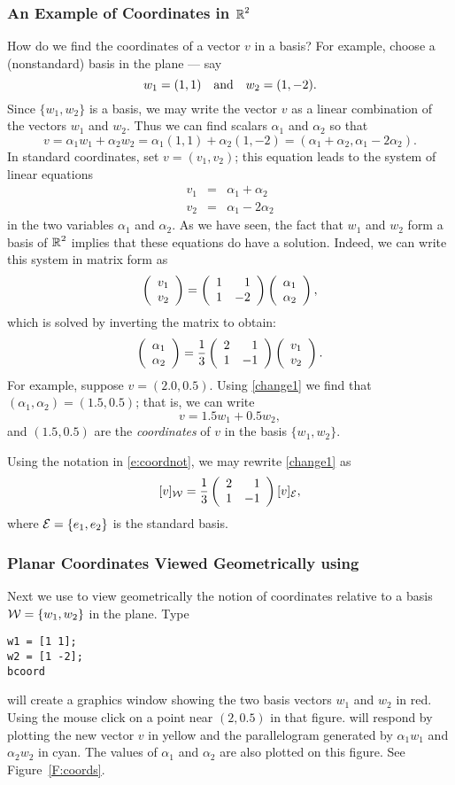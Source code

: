 \documentclass{ximera}
\begin{document}
\subsubsection*{An Example of Coordinates in $\mbox{$\Bbb{R}$}^2$}

How do we find the coordinates of a vector $v$ in a basis?  For example,
choose a (nonstandard) basis in the plane --- say
\[
w_1=(1,1) \quad\mbox{and}\quad w_2=(1,-2).
\]
Since $\{w_1,w_2\}$ is a basis, we may write the vector
$v$ as a linear combination of the vectors $w_1$ and
$w_2$.  Thus we can find scalars $\alpha_1$ and $\alpha_2$ so
that
\[
v=\alpha_1 w_1 + \alpha_2 w_2 = \alpha_1(1,1)+\alpha_2(1,-2)
= (\alpha_1+ \alpha_2,\alpha_1 -2 \alpha_2).
\]
In standard coordinates, set $v=(v_1,v_2)$; this equation leads to the
system of linear equations
\begin{eqnarray*}
v_1 & = & \alpha_1 + \alpha_2 \\
v_2 & = & \alpha_1 -2 \alpha_2
\end{eqnarray*}
in the two variables $\alpha_1$ and $\alpha_2$. As we have seen,
the fact that $w_1$ and $w_2$ form a basis of $\mbox{$\Bbb{R}$}^2$ implies that
these equations do have a solution.  Indeed, we can write this
system in matrix form as
\[
\left(\begin{array}{r} v_1 \\ v_2\end{array}\right) = \left(\begin{array}{rr} 1 & 1\\ 1 &-2\end{array}\right)\left(\begin{array}{r} \alpha_1 \\ \alpha_2\end{array}\right),
\]
which is solved by inverting the matrix to obtain:
\begin{equation} \label{change1}
\left(\begin{array}{r} \alpha_1 \\ \alpha_2\end{array}\right)= \frac{1}{3}\left(\begin{array}{rr} 2 & 1\\ 1 &-1\end{array}\right)
\left(\begin{array}{r} v_1 \\ v_2\end{array}\right).
\end{equation}
For example, suppose $v=(2.0,0.5)$.  Using \eqref{change1} we find that
$(\alpha_1,\alpha_2)=(1.5,0.5)$; that is, we can write
\[
v = 1.5w_1 + 0.5w_2,
\]
and $(1.5,0.5)$ are the {\em coordinates\/}  of
$v$ in the basis $\{w_1,w_2\}$.

Using the notation in \eqref{e:coordnot}, we may rewrite \eqref{change1} as
\[
[v]_{\cal W} = \frac{1}{3}\left(\begin{array}{rr} 2 & 1\\ 1 &-1\end{array}\right) [v]_{\cal E},
\]
where ${\cal E} = \{e_1,e_2\}$ is the standard basis.

\subsubsection*{Planar Coordinates Viewed Geometrically using \Matlab}

Next we use \Matlab to view geometrically the notion of coordinates
relative to a basis ${\cal W}=\{w_1,w_2\}$ in the plane.  Type
\begin{verbatim}
w1 = [1 1];
w2 = [1 -2];
bcoord
\end{verbatim} 
\Matlab will create a graphics window showing the two basis vectors
$w_1$ and $w_2$ in red.  Using the mouse click on a point near
$(2,0.5)$ in that figure.  \Matlab will respond by plotting the
new vector $v$ in yellow and the parallelogram generated by
$\alpha_1w_1$ and $\alpha_2w_2$ in cyan.  The values of $\alpha_1$
and $\alpha_2$ are also plotted on this figure.  See
Figure~\ref{F:coords}.
\end{document}
